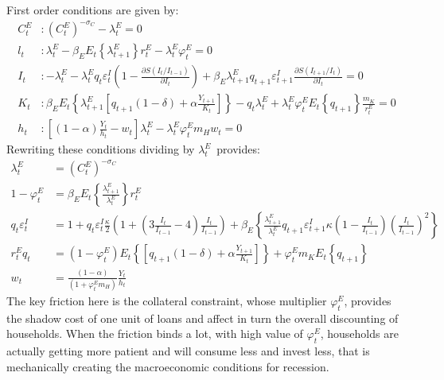 \documentclass[a4paper,12pt]{article}%
\begin{document}
First order conditions are given by:%
\begin{align}
C_{t}^{E}  &  :\left(  C_{t}^{E}\right)  ^{-\sigma_{C}}-\lambda_{t}^{E}=0\\
l_{t}  &  :\lambda_{t}^{E}-\beta_{E}E_{t}\left\{  \lambda_{t+1}^{E}\right\}
r_{t}^{E}-\lambda_{t}^{E}\varphi_{t}^{E}=0\\
I_{t}  &  :-\lambda_{t}^{E}-\lambda_{t}^{E}q_{t}\varepsilon_{t}^{I}\left(
1-\frac{\partial S\left(  I_{t}/I_{t-1}\right)  }{\partial I_{t}}\right)
+\beta_{E}\lambda_{t+1}^{E}q_{t+1}\varepsilon_{t+1}^{I}\frac{\partial S\left(
I_{t+1}/I_{t}\right)  }{\partial I_{t}}=0\\
K_{t}  &  :\beta_{E}E_{t}\left\{  \lambda_{t+1}^{E}\left[  q_{t+1}\left(
1-\delta\right)  +\alpha\frac{Y_{t+1}}{K_{t}}\right]  \right\}  -q_{t}%
\lambda_{t}^{E}+\lambda_{t}^{E}\varphi_{t}^{E}E_{t}\left\{  q_{t+1}\right\}
\frac{m_{K}}{r_{t}^{E}}=0\\
h_{t}  &  :\left[  \left(  1-\alpha\right)  \frac{Y_{t}}{h_{t}}-w_{t}\right]
\lambda_{t}^{E}-\lambda_{t}^{E}\varphi_{t}^{E}m_{H}w_{t}=0
\end{align}
Rewriting these conditions dividing by $\lambda_{t}^{E}$\ provides:
\begin{align}
\lambda_{t}^{E}  &  =\left(  C_{t}^{E}\right)  ^{-\sigma_{C}}\\
1-\varphi_{t}^{E}  &  =\beta_{E}E_{t}\left\{  \frac{\lambda_{t+1}^{E}}%
{\lambda_{t}^{E}}\right\}  r_{t}^{E}\\
q_{t}\varepsilon_{t}^{I}  &  =1+q_{t}\varepsilon_{t}^{I}\frac{\kappa}%
{2}\left(  1+\left(  3\frac{I_{t}}{I_{t-1}}-4\right)  \frac{I_{t}}{I_{t-1}%
}\right)  +\beta_{E}\left\{  \frac{\lambda_{t+1}^{E}}{\lambda_{t}^{E}}%
q_{t+1}\varepsilon_{t+1}^{I}\kappa\left(  1-\frac{I_{t}}{I_{t-1}}\right)
\left(  \frac{I_{t}}{I_{t-1}}\right)  ^{2}\right\} \\
r_{t}^{E}q_{t}  &  =\left(  1-\varphi_{t}^{E}\right)  E_{t}\left\{  \left[
q_{t+1}\left(  1-\delta\right)  +\alpha\frac{Y_{t+1}}{K_{t}}\right]  \right\}
+\varphi_{t}^{E}m_{K}E_{t}\left\{  q_{t+1}\right\} \\
w_{t}  &  =\frac{\left(  1-\alpha\right)  }{\left(  1+\varphi_{t}^{E}%
m_{H}\right)  }\frac{Y_{t}}{h_{t}}%
\end{align}
The key friction here is the collateral constraint, whose multiplier
$\varphi_{t}^{E}$, provides the shadow cost of one unit of loans and affect in
turn the overall discounting of households. When the friction binds a lot,
with high value of $\varphi_{t}^{E}$, households are actually getting more
patient and will consume less and invest less, that is mechanically creating
the macroeconomic conditions for recession.
\end{document}
